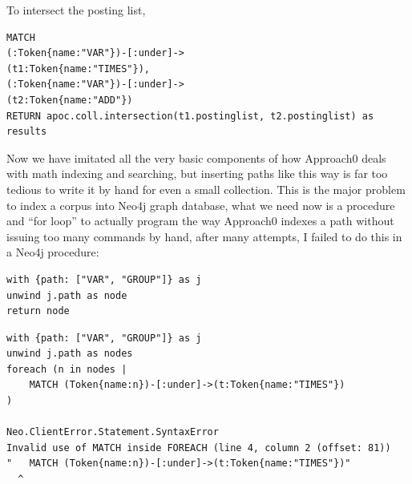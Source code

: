 \documentclass[a4paper]{article}
\begin{document}
To intersect the posting list,
\begin{verbatim}
MATCH
(:Token{name:"VAR"})-[:under]->
(t1:Token{name:"TIMES"}),
(:Token{name:"VAR"})-[:under]->
(t2:Token{name:"ADD"})
RETURN apoc.coll.intersection(t1.postinglist, t2.postinglist) as results
\end{verbatim}

Now we have imitated all the very basic components of how Approach0 deals with math indexing and searching, but inserting paths like this way is far too tedious to write it by hand for even a small collection. This is the major problem to index a corpus into Neo4j graph database, what we need now is a procedure and ``for loop'' to actually program the way Approach0 indexes a path without issuing too many commands by hand, after many attempts, I failed to do this in a Neo4j procedure: 
\begin{verbatim}
with {path: ["VAR", "GROUP"]} as j
unwind j.path as node
return node
\end{verbatim}

\begin{verbatim}
with {path: ["VAR", "GROUP"]} as j
unwind j.path as nodes
foreach (n in nodes |
	MATCH (Token{name:n})-[:under]->(t:Token{name:"TIMES"})
)

Neo.ClientError.Statement.SyntaxError
Invalid use of MATCH inside FOREACH (line 4, column 2 (offset: 81))
"	MATCH (Token{name:n})-[:under]->(t:Token{name:"TIMES"})"
  ^
\end{verbatim}



\end{document}
